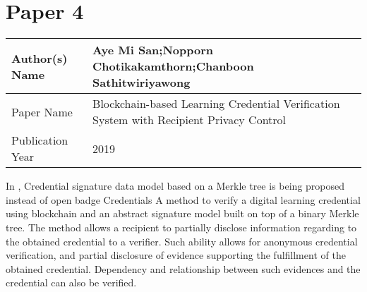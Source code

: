 \section{Paper 4}
    \begin{center}
    \begin{tabular}{ | m{5em} | m{25em} |} 
      \hline
      Author(s) Name & Aye Mi San;Nopporn Chotikakamthorn;Chanboon Sathitwiriyawong \\ 
      \hline
      Paper Name & Blockchain-based Learning Credential Verification System with Recipient Privacy Control \\ 
      \hline
      Publication Year & 2019 \\ 
      \hline
    \end{tabular}
    \end{center}
    In \cite{9225878}, Credential signature data model based on a Merkle tree is being proposed instead of open badge Credentials A method to verify a digital learning credential using blockchain and an abstract signature model built on top of a binary Merkle tree. The method allows a recipient to partially disclose information regarding to the obtained credential to a verifier. Such ability allows for anonymous credential verification, and partial disclosure of evidence supporting the fulfillment of the obtained credential. Dependency and relationship between such evidences and the credential can also be verified.
